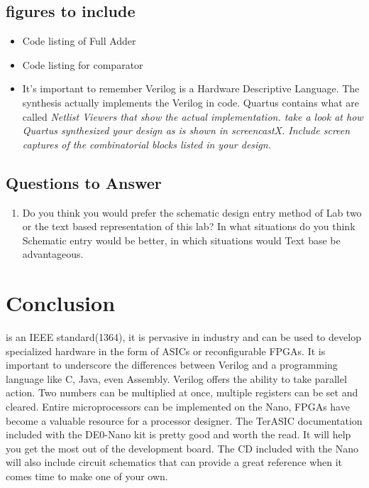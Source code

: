     \subsection{figures to include}
    \begin{itemize}
      \item Code listing of Full Adder
      \item Code listing for comparator
      \item It's important to remember Verilog is a Hardware Descriptive Language. The synthesis actually implements the Verilog in code. Quartus contains what are called \it{Netlist Viewers} that show the actual implementation. take a look at how Quartus synthesized your design as is shown in screencastX. Include screen captures of the combinatorial blocks listed in your design.
    \end{itemize}

    \subsection{Questions to Answer}
      \begin{enumerate}
        \item Do you think you would prefer the schematic design entry method of Lab two or the text based representation of this lab? In what situations do you think Schematic entry would be better, in which situations would Text base be advantageous.
      \end{enumerate}

  \section{Conclusion}
     is an IEEE standard(1364)\cite{Wikipedia:Verilog}, it is pervasive in industry and can be used to develop specialized hardware in the form of ASICs or reconfigurable FPGAs. It is important to underscore the differences between Verilog and a programming language like C, Java, even Assembly. Verilog offers the ability to take parallel action. Two numbers can be multiplied at once, multiple registers can be set and cleared. Entire microprocessors can be implemented on the Nano, FPGAs have become a valuable resource for a processor designer. The TerASIC documentation included with the DE0-Nano kit is pretty good and worth the read. It will help you get the most out of the development board. The CD included with the Nano will also include circuit schematics that can provide a great reference when it comes time to make one of your own.

  


